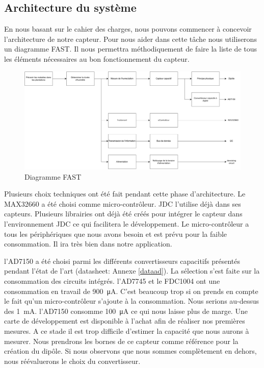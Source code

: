 \subsection{Architecture du système}

En nous basant sur le cahier des charges, nous pouvons commencer à concevoir l'architecture de notre capteur. Pour nous aider dans cette tâche nous utiliserons un diagramme FAST. Il nous permettra méthodiquement de faire la liste de tous les éléments nécessaires au bon fonctionnement du capteur.

\begin{figure}[!ht]
 \centering
 \includegraphics[width=16cm]{DiagrammeFAST.pdf}
 \caption{Diagramme FAST}
\end{figure}

Plusieurs choix techniques ont été fait pendant cette phase d'architecture. Le MAX32660 a été choisi comme micro-contrôleur. JDC l'utilise déjà dans ses capteurs. Plusieurs librairies ont déjà été créés pour intégrer le capteur dans l’environnement JDC ce qui facilitera le développement. Le micro-contrôleur a tous les périphériques que nous avons besoin et est prévu pour la faible consommation. Il ira très bien dans notre application.


l'AD7150 a été choisi parmi les différents convertisseurs capacitifs présentés pendant l'état de l'art (datasheet: Annexe \ref{dataad}). La sélection s'est faite sur la consommation des circuits intégrés. l'AD7745 et le FDC1004 ont une consommation en travail de  \SI{900}{\micro\ampere}. C'est beaucoup trop si on prends en compte le fait qu'un micro-contrôleur s'ajoute à la consommation. Nous serions au-dessus des \SI{1}{\milli\ampere}. l'AD7150 consomme \SI{100}{\micro\ampere} ce qui nous laisse plus de marge. Une carte de développement est disponible à l'achat afin de réaliser nos premières mesures. A ce stade il est trop difficile d'estimer la capacité que nous aurons à mesurer. Nous prendrons les bornes de ce capteur comme référence pour la création du dipôle. Si nous observons que nous sommes complètement en dehors, nous réévaluerons le choix du convertisseur.

